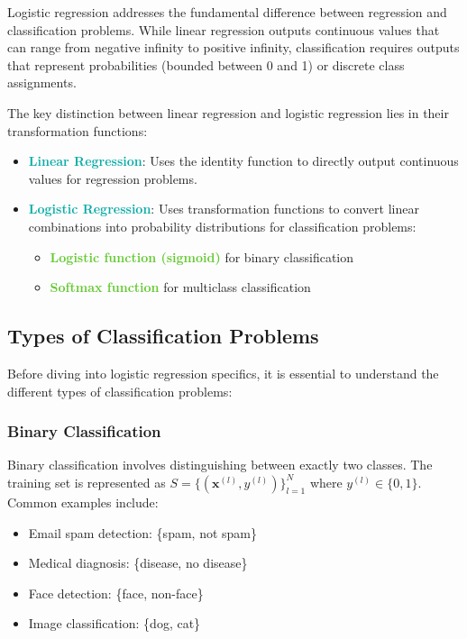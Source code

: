 \documentclass[twoside]{article}
\newcommand{\highlightbluetext}[1]{\textcolor[HTML]{09ACA6}{\textbf{#1}}}
\newcommand{\highlightgreentext}[1]{\textcolor[HTML]{62C92F}{\textbf{#1}}}
\numberwithin{equation}{section}
\begin{document}
	Logistic regression addresses the fundamental difference between regression and classification problems. While linear regression outputs continuous values that can range from negative infinity to positive infinity, classification requires outputs that represent probabilities (bounded between 0 and 1) or discrete class assignments.

	The key distinction between linear regression and logistic regression lies in their transformation functions:
	\begin{itemize}
		\item \highlightbluetext{Linear Regression}: Uses the identity function to directly output continuous values for regression problems.
		\item \highlightbluetext{Logistic Regression}: Uses transformation functions to convert linear combinations into probability distributions for classification problems:
		\begin{itemize}
			\item \highlightgreentext{Logistic function (sigmoid)} for binary classification
			\item \highlightgreentext{Softmax function} for multiclass classification
		\end{itemize}
	\end{itemize}

	\subsection{Types of Classification Problems}
	\label{subsec:TypesOfClassificationProblems}
	
	Before diving into logistic regression specifics, it is essential to understand the different types of classification problems:

	\subsubsection{Binary Classification}
	\label{subsubsec:BinaryClassification}
	Binary classification involves distinguishing between exactly two classes. The training set is represented as $S = \{(\mathbf{x}^{(l)}, y^{(l)})\}_{l=1}^N$ where $y^{(l)} \in \{0, 1\}$. Common examples include:
	\begin{itemize}
		\item Email spam detection: \{spam, not spam\}
		\item Medical diagnosis: \{disease, no disease\}
		\item Face detection: \{face, non-face\}
		\item Image classification: \{dog, cat\}
	\end{itemize}
\end{document}
